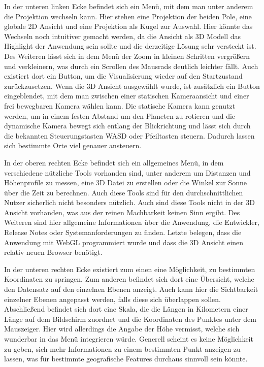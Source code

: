 In der unteren linken Ecke befindet sich ein Menü, mit dem man unter anderem die Projektion wechseln kann. Hier stehen eine Projektion der beiden Pole, eine globale 2D Ansicht und eine Projektion als Kugel zur Auswahl. Hier könnte das Wechseln noch intuitiver gemacht werden, da die Ansicht als 3D Modell das Highlight der Anwendung sein sollte und die derzeitige Lösung sehr versteckt ist. Des Weiteren lässt sich in dem Menü der Zoom in kleinen Schritten vergrößern und verkleinern, was durch ein Scrollen des Mausrads deutlich leichter fällt. Auch existiert dort ein Button, um die Visualisierung wieder auf den Startzustand zurückzusetzen. Wenn die 3D Ansicht ausgewählt wurde, ist zusätzlich ein Button eingeblendet, mit dem man zwischen einer statischen Kameraansicht und einer frei bewegbaren Kamera wählen kann. Die statische Kamera kann genutzt werden, um in einem festen Abstand um den Planeten zu rotieren und die dynamische Kamera bewegt sich entlang der Blickrichtung und lässt sich durch die bekannten Steuerungstasten WASD oder Pfeiltasten steuern. Dadurch lassen sich bestimmte Orte viel genauer ansteuern.

In der oberen rechten Ecke befindet sich ein allgemeines Menü, in dem verschiedene nützliche Tools vorhanden sind, unter anderem um Distanzen und Höhenprofile zu messen, eine 3D Datei zu erstellen oder die Winkel zur Sonne über die Zeit zu berechnen. Auch diese Tools sind für den durchschnittlichen Nutzer sicherlich nicht besonders nützlich. Auch sind diese Tools nicht in der 3D Ansicht vorhanden, was aus der reinen Machbarkeit keinen Sinn ergibt. Des Weiteren sind hier allgemeine Informationen über die Anwendung, die Entwickler, Release Notes oder Systemanforderungen zu finden. Letzte belegen, dass die Anwendung mit WebGL programmiert wurde und dass die 3D Ansicht einen relativ neuen Browser benötigt.

In der unteren rechten Ecke existiert zum einen eine Möglichkeit, zu bestimmten Koordinaten zu springen. Zum anderen befindet sich dort eine Übersicht, welche den Datensatz auf den einzelnen Ebenen anzeigt. Auch kann hier die Sichtbarkeit einzelner Ebenen angepasst werden, falls diese sich überlappen sollen. Abschließend befindet sich dort eine Skala, die die Längen in Kilometern einer Länge auf dem Bildschirm zuordnet und die Koordinaten des Punktes unter dem Mauszeiger. Hier wird allerdings die Angabe der Höhe vermisst, welche sich wunderbar in das Menü integrieren würde. Generell scheint es keine Möglichkeit zu geben, sich mehr Informationen zu einem bestimmten Punkt anzeigen zu lassen, was für bestimmte geografische Features durchaus sinnvoll sein könnte.

